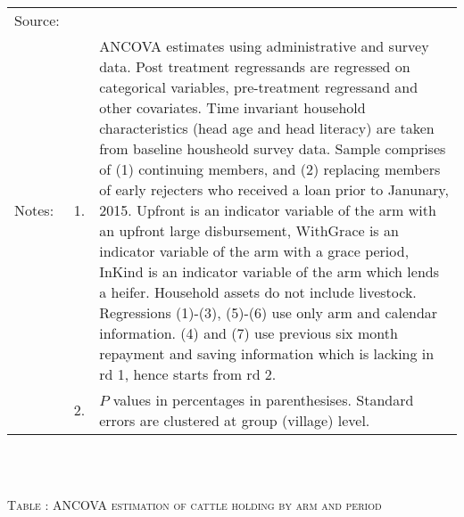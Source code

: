 \begin{minipage}[t]{14cm}
  \renewcommand{\arraystretch}{.55}
  \hfil{}\\
\renewcommand{\arraystretch}{.8}
\setlength{\tabcolsep}{1pt} \begin{tabular}{>{\hfill\scriptsize}p{1cm}<{}>{\hfill\scriptsize}p{.25cm}<{}>{\scriptsize}p{12cm}<{\hfill}} 
Source:& \multicolumn{2}{l}{\scriptsize Estimated with GUK administrative and survey data.}\\
Notes: & 1. & ANCOVA estimates using administrative and survey data. Post treatment regressands are regressed on categorical variables, pre-treatment regressand and other covariates. Time invariant household characteristics (head age and head literacy) are taken from baseline housheold survey data. Sample comprises of (1) continuing members, and (2) replacing members of early rejecters who received a loan prior to Janunary, 2015.  \textsf{Upfront} is an indicator variable of the arm with an upfront large disbursement, \textsf{WithGrace} is an indicator variable of the arm with a grace period, \textsf{InKind} is an indicator variable of the arm which lends a heifer. Household assets do not include livestock. Regressions (1)-(3), (5)-(6) use only arm and calendar information. (4) and (7) use previous six month repayment and saving information which is lacking in rd 1, hence starts from rd 2.\\
& 2. &  $P$ values in percentages in parenthesises. Standard errors are clustered at group (village) level. %
 \end{tabular}
\end{minipage} \\\\\hspace{-1cm}\begin{minipage}[t]{14cm} \hfil\textsc{\normalsize Table \thetable: ANCOVA estimation of cattle holding by arm and period\label{tab ANCOVA cow time varying}}\\ \setlength{\tabcolsep}{1pt}
  \setlength{\baselineskip}{8pt}
  \renewcommand{\arraystretch}{.55}
  \hfil\begin{tikzpicture}

\end{tikzpicture}
\end{minipage}
